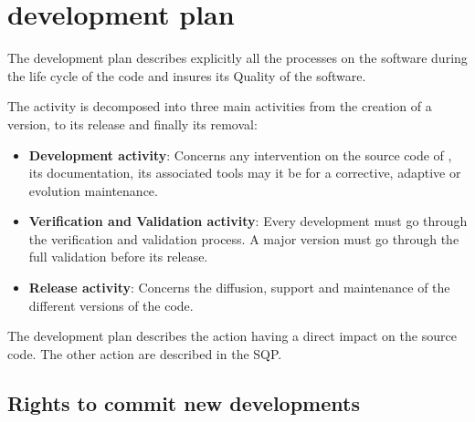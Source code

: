 \chapter{\telemacsystem development plan}
\label{devplan}

The development plan describes explicitly all the processes on the software
during the life cycle of the \telemacsystem code and insures its Quality of
the software.

The \telemacsystem activity is decomposed into three main activities from the creation of
a version, to its release and finally its removal:
\begin{itemize}
\item \textbf{Development activity}: Concerns any intervention on the source
code of \telemacsystem, its documentation, its associated tools may it be for a
corrective, adaptive or evolution maintenance.
\item \textbf{Verification and Validation activity}: Every development must go
through the verification and validation process. A major version must go
through the full validation before its release.
\item \textbf{Release activity}: Concerns the diffusion, support and maintenance
of the different versions of the code.
\end{itemize}

The development plan describes the action having a direct impact on the source
code. The other action are described in the SQP.

\section{Rights to commit new developments}

